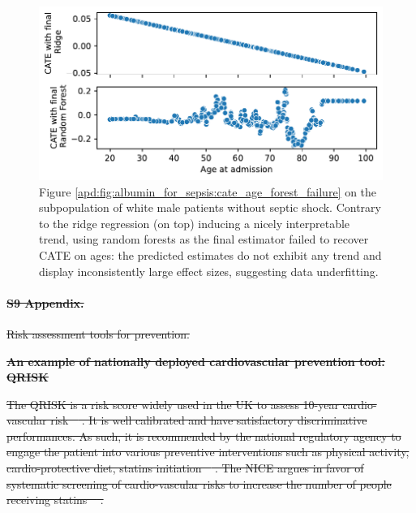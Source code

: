 \documentclass[10pt,letterpaper]{article}
\providecommand{\DIFdeltex}[1]{{\protect\color{red}\sout{#1}}}                      %
\providecommand{\DIFdelbegin}{} %
\providecommand{\DIFdelend}{} %
\providecommand{\DIFdel}[1]{\texorpdfstring{\DIFdeltex{#1}}{}} %
\newcommand{\DIFscaledelfig}{0.5}
\newlength{\DIFdelgraphicswidth} %
\newlength{\DIFdelgraphicsheight} %
\newcommand{\DIFdelincludegraphics}[2][]{%
\sbox{\DIFdelgraphicsbox}{\DIFOincludegraphics[#1]{#2}}%
\settoboxwidth{\DIFdelgraphicswidth}{\DIFdelgraphicsbox} %
\settoboxtotalheight{\DIFdelgraphicsheight}{\DIFdelgraphicsbox} %
\scalebox{\DIFscaledelfig}{%
\parbox[b]{\DIFdelgraphicswidth}{\usebox{\DIFdelgraphicsbox}\\[-\baselineskip] \rule{\DIFdelgraphicswidth}{0em}}\llap{\resizebox{\DIFdelgraphicswidth}{\DIFdelgraphicsheight}{%
\setlength{\unitlength}{\DIFdelgraphicswidth}%
\begin{picture}(1,1)%
\thicklines\linethickness{2pt} %
{\color[rgb]{1,0,0}\put(0,0){\framebox(1,1){}}}%
{\color[rgb]{1,0,0}\put(0,0){\line( 1,1){1}}}%
{\color[rgb]{1,0,0}\put(0,1){\line(1,-1){1}}}%
\end{picture}%
}\hspace*{3pt}}} %
} %
\DeclareRobustCommand{\DIFdelbegin}{\DIFOdelbegin \let\includegraphics\DIFdelincludegraphics} %
\DeclareRobustCommand{\DIFdelend}{\DIFOaddend \let\includegraphics\DIFOincludegraphics} %
\begin{document}
\begin{figure}
  \centering
  \includegraphics[width=\linewidth]{img_supp/cate_shock_random_forest.pdf}
  \caption{Figure \ref{apd:fig:albumin_for_sepsis:cate_age_forest_failure} on
    the subpopulation of white male patients without septic shock. Contrary to
    the ridge regression (on top) inducing a nicely interpretable trend, using
    random forests as the final estimator failed to recover CATE on ages: the
    predicted estimates do not exhibit any trend and display inconsistently
    large effect sizes, suggesting data underfitting.
  }\label{apd:fig:albumin_for_sepsis:cate_failure}
\end{figure}
\clearpage

\DIFdelbegin \paragraph*{\DIFdel{S9 Appendix.}}
\DIFdel{Risk assessment tools for prevention.}%

\textbf{\DIFdel{An example of nationally deployed cardiovascular prevention tool: QRISK}}

\DIFdel{The QRISK is a risk score widely used in the UK to assess 10-year
  cardio-vascular risk \mbox{%
    \cite{hippisley2017development}}\hskip0pt%
  . It is well calibrated
  and have satisfactory discriminative performances. As such, it is recommended
  by the national regulatory agency to engage the patient into various
  preventive interventions such as physical activity, cardio-protective diet,
  statins initiation \mbox{%
    \cite{guideline2023cardiovascular}}\hskip0pt%
  . The NICE argues in favor
  of systematic screening of cardio-vascular risks to increase the number of
  people receiving statins \mbox{%
    \cite{guideline2023cardiovascular}}\hskip0pt%
  .
}\DIFdelend %
\end{document}
